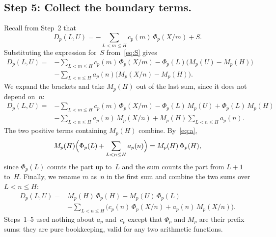 \documentclass[11pt,a4paper]{amsart}
\numberwithin{equation}{section}
\newcommand{\step}[1]{\subsection*{#1}}
\begin{document}
\step{Step 5: Collect the boundary terms.}
Recall from Step~2 that
\[
  D_p(L,U)=-\sum_{L<m\le H}c_p(m)\,\Phi_p(X/m)+S.
\]
Substituting the expression for~$S$ from~\eqref{eq:S} gives
\[
\begin{split}
  D_p(L,U)={}&-\sum_{L<m\le H}c_p(m)\,\Phi_p(X/m)
   -\Phi_p(L)\bigl(M_p(U)-M_p(H)\bigr)\\
  &-\sum_{L<n\le H}a_p(n)\bigl(M_p(X/n)-M_p(H)\bigr).
\end{split}
\]
We expand the brackets and take $M_p(H)$ out of the last sum, since it does not
depend on~$n$:
\[
\begin{split}
  D_p(L,U)={}&-\sum_{L<m\le H}c_p(m)\,\Phi_p(X/m)
   -\Phi_p(L)\,M_p(U)+\Phi_p(L)\,M_p(H)\\
  &-\sum_{L<n\le H}a_p(n)\,M_p(X/n)+M_p(H)\sum_{L<n\le H}a_p(n).
\end{split}
\]
The two positive terms containing $M_p(H)$ combine. By~\eqref{eq:a},
\[
  M_p(H)\Bigl(\Phi_p(L)+\sum_{L<n\le H}a_p(n)\Bigr)=M_p(H)\,\Phi_p(H),
\]
since $\Phi_p(L)$ counts the part up to~$L$ and the sum counts the part from
$L+1$ to~$H$. Finally, we rename $m$ as~$n$ in the first sum and combine the
two sums over $L<n\le H$:
\begin{equation}\label{eq:step5}
\begin{split}
  D_p(L,U)={}&M_p(H)\,\Phi_p(H)-M_p(U)\,\Phi_p(L)\\
  &-\sum_{L<n\le H}\bigl(c_p(n)\,\Phi_p(X/n)+a_p(n)\,M_p(X/n)\bigr).
\end{split}
\end{equation}
Steps~1--5 used nothing about $a_p$ and~$c_p$ except that $\Phi_p$ and $M_p$
are their prefix sums: they are pure bookkeeping, valid for any two arithmetic
functions.
\end{document}
